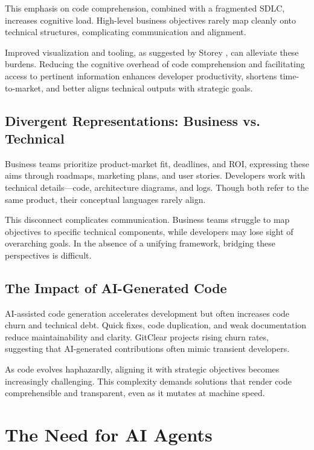 \documentclass[12pt,twocolumn]{article}
\begin{document}
This emphasis on code comprehension, combined with a fragmented SDLC, increases cognitive load. High-level business 
objectives rarely map cleanly onto technical structures, complicating communication and alignment.

Improved visualization and tooling, as suggested by Storey \textcite{meyer2021today}, can alleviate these burdens. 
Reducing the cognitive overhead of code comprehension and facilitating access to pertinent information enhances 
developer productivity, shortens time-to-market, and better aligns technical outputs with strategic goals.

\subsection{Divergent Representations: Business vs. Technical}

Business teams prioritize product-market fit, deadlines, and ROI, expressing these aims through roadmaps, marketing plans,
and user stories. 
Developers work with technical details—code, architecture diagrams, and logs. Though both refer to the same product, their 
conceptual languages rarely align.

This disconnect complicates communication. Business teams struggle to map objectives to specific technical components,
while developers may lose sight of overarching goals. 
In the absence of a unifying framework, bridging these perspectives is difficult.

\subsection{The Impact of AI-Generated Code}

AI-assisted code generation accelerates development but often increases code churn and technical debt. Quick fixes, 
code duplication, and weak documentation reduce maintainability and clarity. 
GitClear \textcite{gitclear2024} projects rising churn rates, suggesting that AI-generated contributions often mimic 
transient developers.

As code evolves haphazardly, aligning it with strategic objectives becomes increasingly challenging. This complexity 
demands solutions that render code comprehensible and transparent, 
even as it mutates at machine speed.

\section{The Need for AI Agents}
\end{document}
